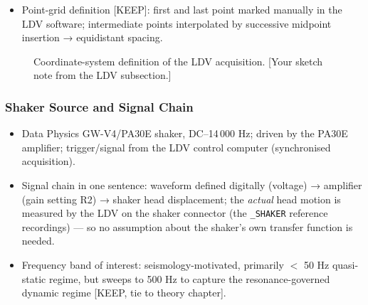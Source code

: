\begin{itemize}
\begin{itemize}
        profile frame;
      \item all reported X, Y, Z coordinates are in this local system;
      \item known offset between local system and the shaker-head origin,
        corrected in preprocessing: $x$: 15.9\,cm, $y$: 6\,cm, $z$: 6\,cm.
    \end{itemize}
  \item Point-grid definition [KEEP]: first and last point marked manually in
    the LDV software; intermediate points interpolated by successive midpoint
    insertion → equidistant spacing.
\end{itemize}

\begin{figure}[htb]
  \centering
  \caption{Coordinate-system definition of the LDV acquisition. [Your
    sketch note from the LDV subsection.]}
  \label{fig:methods:coords}
\end{figure}

\subsubsection{Shaker Source and Signal Chain}
\begin{itemize}
  \item [KEEP] Data Physics GW-V4/PA30E shaker, DC–14\,000 Hz; driven by the
    PA30E amplifier; trigger/signal from the LDV control computer
    (synchronised acquisition).
  \item Signal chain in one sentence: waveform defined digitally (voltage) →
    amplifier (gain setting R2) → shaker head displacement; the \emph{actual}
    head motion is measured by the LDV on the shaker connector (the
    \texttt{\_SHAKER} reference recordings) — so no assumption about the
    shaker's own transfer function is needed.
  \item Frequency band of interest: seismology-motivated, primarily
    $<$ 50 Hz quasi-static regime, but sweeps to 500 Hz to capture the
    resonance-governed dynamic regime [KEEP, tie to theory chapter].
\end{itemize}

